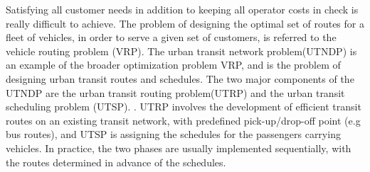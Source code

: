 Satisfying all customer needs in addition to keeping all operator costs in check is really difficult to achieve. The problem of designing the optimal set of routes for a fleet of vehicles, in order to serve a given set of customers, is referred to the vehicle routing problem (VRP). The urban transit network problem(UTNDP) is an example of the broader optimization problem VRP, and is the problem of designing urban transit routes and schedules. The two major components of the UTNDP are the urban transit routing problem(UTRP) and the urban transit scheduling problem (UTSP). \citep{fan09}.
UTRP involves the development of efficient transit routes on an existing transit network, with predefined pick-up/drop-off point (e.g bus routes), and UTSP is assigning the schedules for the passengers carrying vehicles. In practice, the two phases are usually implemented sequentially, with the routes determined in advance of the schedules. 













